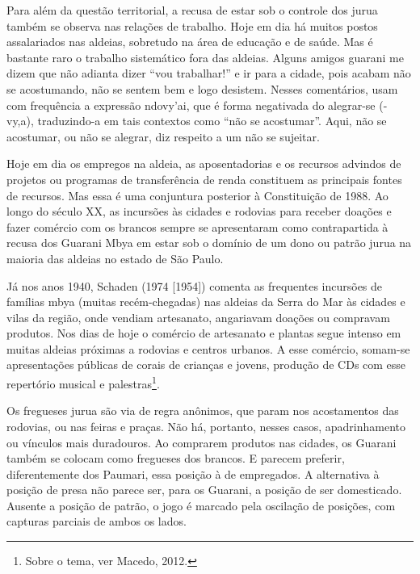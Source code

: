 Para além da questão territorial, a recusa de estar sob o controle dos
jurua também se observa nas relações de trabalho. Hoje em dia há muitos
postos assalariados nas aldeias, sobretudo na área de educação e de
saúde. Mas é bastante raro o trabalho sistemático fora das aldeias.
Alguns amigos guarani me dizem que não adianta dizer ``vou trabalhar!'' e
ir para a cidade, pois acabam não se acostumando, não se sentem bem e
logo desistem. Nesses comentários, usam com frequência a expressão
ndovy’ai, que é forma negativada do alegrar-se (-vy,a), traduzindo-a em
tais contextos como ``não se acostumar''. Aqui, não se acostumar, ou não
se alegrar, diz respeito a um não se sujeitar.

Hoje em dia os empregos na aldeia, as aposentadorias e os recursos
advindos de projetos ou programas de transferência de renda constituem
as principais fontes de recursos. Mas essa é uma conjuntura posterior à
Constituição de 1988. Ao longo do século XX, as incursões às cidades e
rodovias para receber doações e fazer comércio com os brancos sempre se
apresentaram como contrapartida à recusa dos Guarani Mbya em estar sob
o domínio de um dono ou patrão jurua na maioria das aldeias no estado
de São Paulo. 

Já nos anos 1940, Schaden (1974 [1954]) comenta as frequentes incursões
de famílias mbya (muitas recém-chegadas) nas aldeias da Serra do Mar às
cidades e vilas da região, onde vendiam artesanato, angariavam doações
ou compravam produtos. Nos dias de hoje o comércio de artesanato e
plantas segue intenso em muitas aldeias próximas a rodovias e centros
urbanos. A esse comércio, somam-se apresentações públicas de corais de
crianças e jovens, produção de CDs com esse repertório musical e
palestras\footnote{Sobre o tema, ver Macedo, 2012.}. 

Os fregueses jurua são via de regra anônimos, que param nos acostamentos
das rodovias, ou nas feiras e praças. Não há, portanto, nesses casos,
apadrinhamento ou vínculos mais duradouros. Ao comprarem produtos nas
cidades, os Guarani também se colocam como fregueses dos brancos. E
parecem preferir, diferentemente dos Paumari, essa posição à de
empregados. A alternativa à posição de presa não parece ser, para os
Guarani, a posição de ser domesticado. Ausente a posição de patrão, o
jogo é marcado pela oscilação de posições, com capturas parciais de
ambos os lados.

